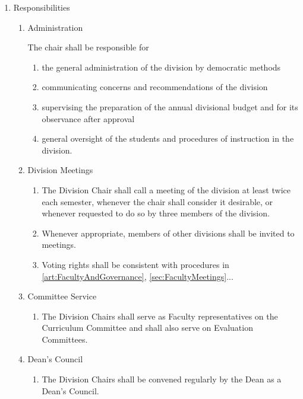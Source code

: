 \documentclass{manual}
\newcommand{\itemLevelA}{\alph*.}
\newcommand{\itemLevelB}{\arabic*)}
\newcommand{\itemLevelC}{\alph*)}
\newcommand{\itemRefA}{\alph*}
\newcommand{\itemRefB}{\arabic*}
\newcommand{\itemRefC}{\alph*}
\begin{document}
\begin{enumerate}[label=\itemLevelA,ref=\itemRefA]
\item \label{item:responsibilities01} Responsibilities
\begin{enumerate}[label=\itemLevelB,ref=\itemRefB]
\item Administration

The chair shall be responsible for
\begin{enumerate}[label=\itemLevelC,ref=\itemRefC]
\item the general administration of the division by democratic methods
\item communicating concerns and recommendations of the division
\item supervising the preparation of the annual divisional budget and for its observance after approval
\item general oversight of the students and procedures of instruction in the division.
\end{enumerate}

\item Division Meetings
\begin{enumerate}[label=\itemLevelC,ref=\itemRefC]
\item The Division Chair shall call a meeting of the division at least twice each semester, whenever the chair shall consider it desirable, or whenever requested to do so by three members of the division.
\item Whenever appropriate, members of other divisions shall be invited to meetings.
\item Voting rights shall be consistent with procedures in \cref{art:FacultyAndGovernance}, \cref{sec:FacultyMeetings}...
\end{enumerate}

\item Committee Service
\begin{enumerate}[label=\itemLevelC,ref=\itemRefC]
\item The Division Chairs shall serve as Faculty representatives on the Curriculum Committee and shall also serve on Evaluation Committees. 
\end{enumerate}

\item \label{iitem:deansCouncil02} Dean's Council
\begin{enumerate}[label=\itemLevelC,ref=\itemRefC]
\item The Division Chairs shall be convened regularly by the Dean as a Dean's Council.


\end{enumerate}
\end{enumerate}
\end{enumerate}
\end{document}
